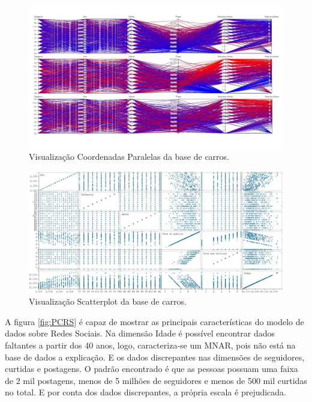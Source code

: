 \documentclass[
	12pt,				%
	openright,			%
	twoside,			%
	a4paper,			%
	english,			%
	brazil				%
	]{abntex2}
\begin{document}
	\begin{figure}[h!]
		\centering
		\includegraphics[width=\linewidth]{./figures/Resultados/PCCarros.png}
		\caption{Visualização Coordenadas Paralelas da base de carros.}
		\label{fig:PCCarros}
	\end{figure}

	\begin{figure}[h!]
		\centering
		\includegraphics[width=\linewidth]{./figures/Resultados/ScatterPlotC.jpg}
		\caption{Visualização Scatterplot da base de carros.}
		\label{fig:ScatterPlotC}
	\end{figure}

	A figura \ref{fig:PCRS} é capaz de mostrar as principais características do modelo de dados sobre Redes Sociais.
	Na dimensão Idade é possível encontrar dados faltantes a partir dos 40 anos, logo, caracteriza-se um MNAR, pois não está na base de dados a explicação.
	E os dados discrepantes nas dimensões de seguidores, curtidas e postagens.
	O padrão encontrado é que as pessoas possuam uma faixa de 2 mil postagens, menos de 5 milhões de seguidores e menos de 500 mil curtidas no total.
	E por conta dos dados discrepantes, a própria escala é prejudicada.
	\par
\end{document}
